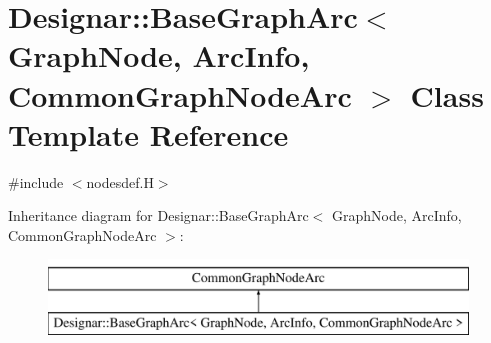 \hypertarget{class_designar_1_1_base_graph_arc}{}\section{Designar\+:\+:Base\+Graph\+Arc$<$ Graph\+Node, Arc\+Info, Common\+Graph\+Node\+Arc $>$ Class Template Reference}
\label{class_designar_1_1_base_graph_arc}


{\ttfamily \#include $<$nodesdef.\+H$>$}

Inheritance diagram for Designar\+:\+:Base\+Graph\+Arc$<$ Graph\+Node, Arc\+Info, Common\+Graph\+Node\+Arc $>$\+:\begin{figure}[H]
\begin{center}
\leavevmode
\includegraphics[height=2.000000cm]{class_designar_1_1_base_graph_arc}
\end{center}
\end{figure}
